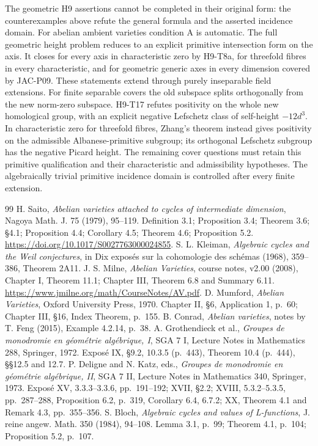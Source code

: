 \documentclass[11pt,a4paper]{article}
\begin{document}
The geometric H9 assertions cannot be completed in their original form:
the counterexamples above refute the general formula and the asserted
incidence domain. For abelian ambient varieties condition A is automatic.
The full geometric height problem reduces to an explicit primitive
intersection form on the axis. It closes for every axis in characteristic
zero by H9-T8a, for threefold fibres in every characteristic, and for
geometric generic axes in every dimension covered by JAC-P09. These
statements extend through purely inseparable field extensions. For
finite separable covers the old subspace splits orthogonally from the
new norm-zero subspace. H9-T17 refutes positivity on the whole new
homological group, with an explicit negative Lefschetz class of
self-height $-12d^3$. In characteristic zero for threefold fibres,
Zhang's theorem instead gives positivity on the admissible
Albanese-primitive subgroup; its orthogonal Lefschetz subgroup has
the negative Picard height. The remaining cover questions must retain
this primitive qualification and their characteristic and admissibility
hypotheses. The algebraically trivial primitive incidence domain is
controlled after every finite extension.
\begin{thebibliography}{99}
 H. Saito, \emph{Abelian varieties attached to cycles of intermediate dimension}, Nagoya Math. J. 75 (1979), 95--119. Definition 3.1; Proposition 3.4; Theorem 3.6; \S4.1; Proposition 4.4; Corollary 4.5; Theorem 4.6; Proposition 5.2. \url{https://doi.org/10.1017/S0027763000024855}.
 S. L. Kleiman, \emph{Algebraic cycles and the Weil conjectures}, in Dix expos\'es sur la cohomologie des sch\'emas (1968), 359--386, Theorem 2A11.
 J. S. Milne, \emph{Abelian Varieties}, course notes, v2.00 (2008), Chapter I, Theorem 11.1; Chapter III, Theorem 6.8 and Summary 6.11. \url{https://www.jmilne.org/math/CourseNotes/AV.pdf}.
 D. Mumford, \emph{Abelian Varieties}, Oxford University Press, 1970. Chapter II, \S6, Application 1, p.~60; Chapter III, \S16, Index Theorem, p.~155.
 B. Conrad, \emph{Abelian varieties}, notes by T. Feng (2015), Example 4.2.14, p.~38.
 A. Grothendieck et al., \emph{Groupes de monodromie en g\'eom\'etrie alg\'ebrique, I}, SGA 7 I, Lecture Notes in Mathematics 288, Springer, 1972. Expos\'e IX, \S9.2, 10.3.5 (p.~443), Theorem 10.4 (p.~444), \S\S12.5 and 12.7.
 P. Deligne and N. Katz, eds., \emph{Groupes de monodromie en g\'eom\'etrie alg\'ebrique, II}, SGA 7 II, Lecture Notes in Mathematics 340, Springer, 1973. Expos\'e XV, 3.3.3--3.3.6, pp.~191--192; XVII, \S2.2; XVIII, 5.3.2--5.3.5, pp.~287--288, Proposition 6.2, p.~319, Corollary 6.4, 6.7.2; XX, Theorem 4.1 and Remark 4.3, pp.~355--356.
 S. Bloch, \emph{Algebraic cycles and values of L-functions}, J. reine angew. Math. 350 (1984), 94--108. Lemma 3.1, p.~99; Theorem 4.1, p.~104; Proposition 5.2, p.~107.
\end{thebibliography}
\end{document}
